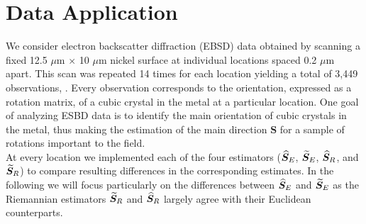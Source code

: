 \section{Data Application}\label{sec:data}

We consider electron backscatter diffraction (EBSD) data obtained by scanning a fixed  12.5 $\mu$m $\times$ 10 $\mu$m nickel surface at individual locations spaced 0.2 $\mu$m apart. This scan was repeated 14 times for each location yielding a total of 3,449 observations, \citep{bingham09, bingham10b}. Every observation corresponds to the orientation, expressed as a rotation matrix, of a cubic crystal in the metal at a particular location. One goal of analyzing ESBD data is to identify the main orientation of cubic crystals in the metal, thus making the estimation of the main direction $\bm S$ for a sample of rotations important to the field.\\

At every location we implemented each of the four estimators (${\widehat{\bm S}_E}$, ${\widetilde{\bm S}_E}$, ${\widehat{\bm S}_R}$, and ${\widetilde{\bm S}_R}$) to compare resulting differences in the corresponding estimates.  In the following we will focus particularly on the differences between ${\widehat{\bm S}_E}$ and ${\widetilde{\bm S}_E}$ as the Riemannian estimators  ${\widetilde{\bm S}_R}$ and ${\widehat{\bm S}_R}$ largely agree with their Euclidean counterparts. 

